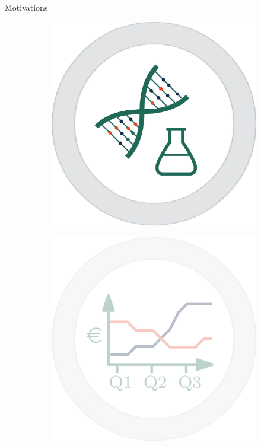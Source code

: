 \documentclass[16pt,usenames,dvipsnames, notheorems]{beamer}
\theoremstyle{definition}
\theoremstyle{example}
\theoremstyle{plain}
\begin{document}
\begin{frame}{Motivations}
\begin{figure}
\begin{subfigure}[c]{0.25\linewidth}
\begin{overprint}
			 \includegraphics[width=\linewidth]{figures/picture_biology.jpg}
		\end{overprint}
	\end{subfigure}
	\hspace{5mm}
	\begin{subfigure}[c]{0.25\linewidth}
		\centering
		\begin{overprint}
			 \includegraphics[width=\linewidth]{figures/picture_finance_t.jpg}

\end{overprint}
\end{subfigure}
\end{figure}
\end{frame}
\end{document}
